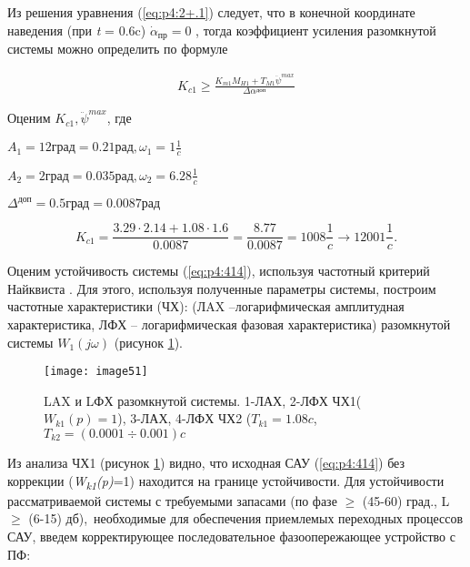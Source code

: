 Из решения уравнения (\ref{eq:p4:2+.1}) следует, что в конечной координате наведения (при \textit{t} = 0.6c)  \( \dot \alpha _{\textit{пр}}=0 \) , тогда коэффициент усиления разомкнутой системы можно определить по формуле \par

\begin{equation}
\label{eq:p4:416}
\begin{alignedat}{2}
K_{c1} \geq \frac{K_{m1}M_{H1}+T_{M1} \ddot \psi ^{max}}{ \Delta  \alpha ^{\textit{доп}}}
\end{alignedat}
\end{equation}

Оценим  \( K_{c1}, \ddot \psi ^{max} \), где 

$A_1 = 12 \textit{град} = 0.21 \textit{рад}, \omega_1 = 1 \frac{1}{c}$

$A_2 = 2 \textit{град} = 0.035 \textit{рад}, \omega_2 = 6.28 \frac{1}{c}$

$\varDelta^{\textit{доп}} =  0.5 \textit{град} = 0.0087 \textit{рад}$

\[ K_{c1}=\frac{3.29 \cdot 2.14 + 1.08 \cdot 1.6}{0.0087} =
\frac{8.77}{0.0087} =
1008 \frac{1}{c} \rightarrow 1200  1 \frac{1}{c}. \] \par

Оценим устойчивость системы (\ref{eq:p4:414}), используя частотный критерий Найквиста \cite[]{Bessekerski}. Для этого, используя полученные параметры системы, построим частотные характеристики (ЧХ): (ЛAX –логарифмическая амплитудная характеристика, ЛФХ – логарифмическая фазовая характеристика) разомкнутой системы $W_1(j \omega)$ (рисунок \ref{fig:LogAmpChar1}).\par

\begin{figure}[ht]
	\centering
	\texttt{[image: image51]} 
	\caption{LAX и LФХ разомкнутой системы. 1-ЛАХ, 2-ЛФХ ЧХ1($W_{k1}(p)=1 $), 3-ЛАХ, 4-ЛФХ ЧХ2 ($T_{k1} = 1.08 c$, $T_{k2} = (0.0001  \div 0.001) c$}
	\label{fig:LogAmpChar1}
\end{figure}

Из анализа ЧХ1 (рисунок \ref{fig:LogAmpChar1}) видно, что исходная САУ (\ref{eq:p4:414}) без коррекции (\textit{W\textsubscript{k1}(p)}=1) находится на границе устойчивости. Для устойчивости рассматриваемой системы с требуемыми запасами (по фазе  $ \geq $  (45-60) град., L $ \geq $  (6-15) дб),\ необходимые для обеспечения приемлемых переходных процессов САУ, введем корректирующее последовательное фазоопережающее устройство с ПФ:

